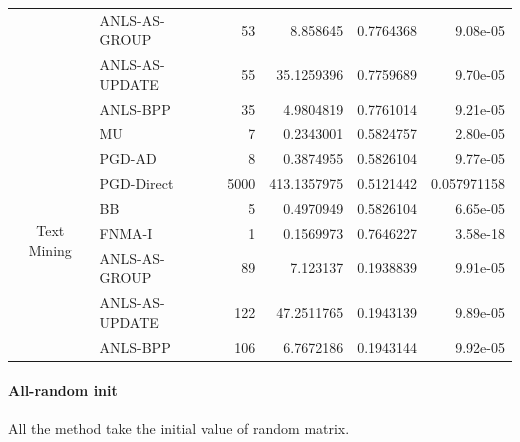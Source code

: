\documentclass[conference,onecolumn,12pt]{IEEEtran}
\numberwithin{equation}{section}
\numberwithin{figure}{section}
\numberwithin{table}{section}
\theoremstyle{definition}
\begin{document}
\begin{table}[htbp]
\begin{tabular}{clrrrr}
			& ANLS-AS-GROUP & 53    & 8.858645 & 0.7764368 & 9.08e-05 \\
			& ANLS-AS-UPDATE & 55    & 35.1259396 & 0.7759689 & 9.70e-05 \\
			& ANLS-BPP & 35    & 4.9804819 & 0.7761014 & 9.21e-05 \\
			\midrule
			\multirow{8}[0]{*}{Text Mining} & MU    & 7     & 0.2343001 & 0.5824757 & 2.80e-05 \\
      & PGD-AD & 8     & 0.3874955 & 0.5826104 & 9.77e-05 \\
      & PGD-Direct & 5000  & 413.1357975 & 0.5121442 & 0.057971158 \\
      & BB    & 5     & 0.4970949 & 0.5826104 & 6.65e-05 \\
      & FNMA-I & 1     & 0.1569973 & 0.7646227 & 3.58e-18 \\
      & ANLS-AS-GROUP & 89    & 7.123137 & 0.1938839 & 9.91e-05 \\
      & ANLS-AS-UPDATE & 122   & 47.2511765 & 0.1943139 & 9.89e-05 \\
      & ANLS-BPP & 106   & 6.7672186 & 0.1943144 & 9.92e-05 \\
			\bottomrule
	  \end{tabular}%
	\label{tab:addlabel}%
  \end{table}%
  
\clearpage
  \paragraph{All-random init}

  All the method take the initial value of random matrix.
  
\end{document}

